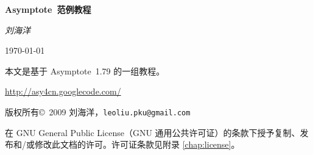 \documentclass[cs4size,oneside,openany,nofonts,UTF8,CJKnormalspaces]
  {ctexbook}[2009/05/20]
\newcommand*\Asy{\textsf{Asymptote}}
\newcommand*\asyversion{1.79}
\begin{document}
\frontmatter

\begin{titlepage}
\begin{center}
  {\bfseries
  \Asy\ 范例教程}
\bigskip

  {\rmfamily\itshape
  刘海洋}
\bigskip

  {\today}
\end{center}
\end{titlepage}

\begingroup
\setlength{\parindent}{0pt}
本文是基于 \Asy\ \asyversion{} 的一组教程。

\url{http://asy4cn.googlecode.com/}
\medskip

版权所有\copyright\ 2009 刘海洋，\nolinkurl{leoliu.pku@gmail.com}

{\setlength{\leftskip}{2em}
在 GNU General Public License（GNU 通用公共许可证）的条款下授予复制、发布和/或修改此文档的许可。许可证条款见附录 \ref{chap:license}。\par}
\endgroup
\newpage

\tableofcontents

\mainmatter



\appendix


\printindex



\end{document}
